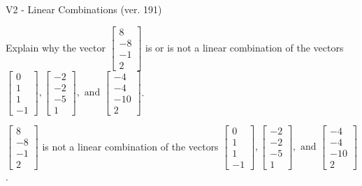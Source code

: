\begin{exercise}
  \begin{exerciseTitle}V2 - Linear Combinations (ver. 191)\end{exerciseTitle}
  \begin{exerciseStatement}
    Explain why the vector \(\left[\begin{array}{c}
8 \\
-8 \\
-1 \\
2
\end{array}\right]\)  is or is not a linear 
	combination of the vectors \(\left[\begin{array}{c}
0 \\
1 \\
1 \\
-1
\end{array}\right] , \left[\begin{array}{c}
-2 \\
-2 \\
-5 \\
1
\end{array}\right] , \text{ and } \left[\begin{array}{c}
-4 \\
-4 \\
-10 \\
2
\end{array}\right]\).
	


  \end{exerciseStatement}
  \begin{exerciseAnswer}
   \(\left[\begin{array}{c}
8 \\
-8 \\
-1 \\
2
\end{array}\right]\) 
  	 is not  
	a linear combination of the vectors \(\left[\begin{array}{c}
0 \\
1 \\
1 \\
-1
\end{array}\right] , \left[\begin{array}{c}
-2 \\
-2 \\
-5 \\
1
\end{array}\right] , \text{ and } \left[\begin{array}{c}
-4 \\
-4 \\
-10 \\
2
\end{array}\right]\).

	
  


  \end{exerciseAnswer}
\end{exercise}